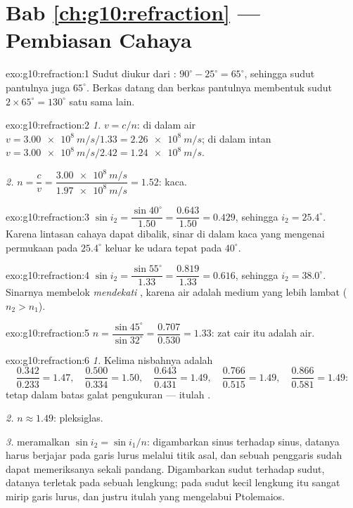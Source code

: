 \section*{Bab \ref{ch:g10:refraction} --- Pembiasan Cahaya}

\begin{solution}{exo:g10:refraction:1}
Sudut diukur dari : 
$90^\circ - 25^\circ = 65^\circ$, sehingga sudut pantulnya juga
$65^\circ$. Berkas datang dan berkas pantulnya membentuk sudut
$2 \times 65^\circ = 130^\circ$ satu sama lain.
\end{solution}

\begin{solution}{exo:g10:refraction:2}
\emph{1.} $v = c/n$: di dalam air
$v = \qty{3.00e8}{m/s}/1.33 = \qty{2.26e8}{m/s}$; di dalam intan
$v = \qty{3.00e8}{m/s}/2.42 = \qty{1.24e8}{m/s}$.

\emph{2.} $n = \dfrac{c}{v} = \dfrac{\qty{3.00e8}{m/s}}
{\qty{1.97e8}{m/s}} = 1.52$: kaca.
\end{solution}

\begin{solution}{exo:g10:refraction:3}
$\sin i_2 = \dfrac{\sin 40^\circ}{1.50} = \dfrac{0.643}{1.50} = 0.429$,
sehingga $i_2 = 25.4^\circ$. Karena lintasan cahaya dapat dibalik,
sinar di dalam kaca yang mengenai permukaan pada $25.4^\circ$ keluar ke
udara tepat pada $40^\circ$.
\end{solution}

\begin{solution}{exo:g10:refraction:4}
$\sin i_2 = \dfrac{\sin 55^\circ}{1.33} = \dfrac{0.819}{1.33} = 0.616$,
sehingga $i_2 = 38.0^\circ$. Sinarnya membelok \emph{mendekati} , karena air adalah medium yang lebih lambat ($n_2 > n_1$).
\end{solution}

\begin{solution}{exo:g10:refraction:5}
$n = \dfrac{\sin 45^\circ}{\sin 32^\circ} = \dfrac{0.707}{0.530}
= 1.33$: zat cair itu adalah air.
\end{solution}

\begin{solution}{exo:g10:refraction:6}
\emph{1.} Kelima nisbahnya adalah
\[
\frac{0.342}{0.233} = 1.47,\quad
\frac{0.500}{0.334} = 1.50,\quad
\frac{0.643}{0.431} = 1.49,\quad
\frac{0.766}{0.515} = 1.49,\quad
\frac{0.866}{0.581} = 1.49 :
\]
tetap dalam batas galat pengukuran --- itulah .

\emph{2.} $n \approx 1.49$: pleksiglas.

\emph{3.}  meramalkan $\sin i_2 = \sin i_1 / n$: digambarkan
sinus terhadap sinus, datanya harus berjajar pada garis lurus melalui
titik asal, dan sebuah penggaris sudah dapat memeriksanya sekali
pandang. Digambarkan sudut terhadap sudut, datanya terletak pada sebuah
lengkung; pada sudut kecil lengkung itu sangat mirip garis lurus, dan
justru itulah yang mengelabui Ptolemaios.
\end{solution}

